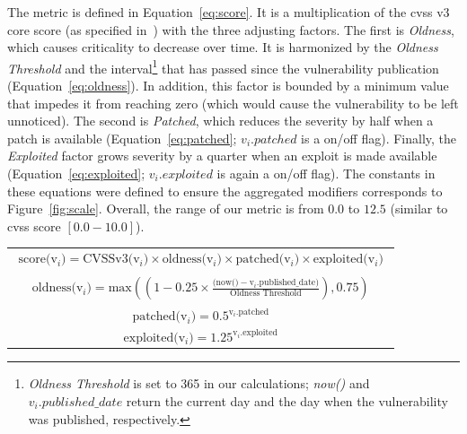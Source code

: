 The metric is defined in Equation~\ref{eq:score}.
It is a multiplication of the \gls{cvss} v3 core score (as specified in~\cite{cvssv3}) with the three adjusting factors. 
The first is \emph{Oldness}, which causes criticality to decrease over time. 
It is harmonized by the \emph{Oldness Threshold} and the interval\footnote{\textit{Oldness Threshold} is set to 365 in our calculations; \textit{now()} and $v_i.published\_date$ return the current day and the day when the vulnerability was published, respectively.} that has passed since the vulnerability publication (Equation~\ref{eq:oldness}). 
In addition, this factor is bounded by a minimum value that impedes it from reaching zero (which would cause the vulnerability to be left unnoticed).
The second is \emph{Patched}, which reduces the severity by half when a patch is available (Equation~\ref{eq:patched}; $v_{i}.patched$ is a on/off flag).
Finally, the \emph{Exploited} factor grows severity by a quarter when an exploit is made available (Equation~\ref{eq:exploited}; $v_{i}.exploited$ is again a on/off flag).
The constants in these equations were defined to ensure the aggregated modifiers corresponds to Figure~\ref{fig:scale}.
Overall, the range of our metric is from $0.0$ to $12.5$ (similar to \gls{cvss} score $[0.0-10.0]$).



\begin{table}[h]
\begin{center}
\begin{tabular}{ c }

\vbox{
\begin{equation}
\begin{split}
\text{score(v$_i$)}=\text{CVSSv3(v$_i$)}\times\text{oldness(v$_i$)}\times\text{patched(v$_i$)}\times\text{exploited(v$_i$)}
\label{eq:score}
\end{split}
\end{equation}
}
\\
\vbox{
\begin{equation} 
\begin{split}
\text{oldness(v$_i$)}=\text{max}\left((1-0.25\times\frac{(\text{now()}-\text{v$_i$.published\_date)}}{\text{Oldness Threshold}}), 0.75\right)
\label{eq:oldness}
\end{split}
\end{equation}
}
\\
\vbox{
\begin{equation} 
\text{patched(v$_i$)}=0.5^{\text{v$_i$.patched}}
\label{eq:patched}
\end{equation} 
}
\\
\vbox{
\begin{equation}
\text{exploited(v$_i$)} = 1.25^{\text{v$_i$.exploited}}
\label{eq:exploited}
\end{equation}  
}
\\ 
\end{tabular}
\end{center}
\end{table}



